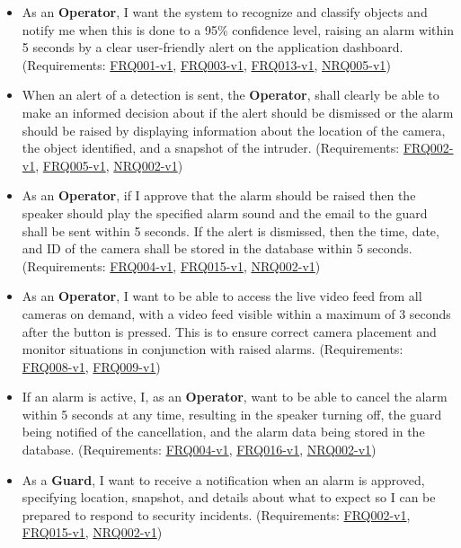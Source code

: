 \documentclass{article}
\begin{document}
 \begin{itemize}
 
    \item As an \textbf{Operator}, I want the system to recognize and classify objects and notify me when this is done to a 95\% confidence level, raising an alarm within 5 seconds by a clear user-friendly alert on the application dashboard. (Requirements: \hyperlink{FRQ001}{FRQ001-v1}, \hyperlink{FRQ003}{FRQ003-v1}, \hyperlink{FRQ013}{FRQ013-v1}, \hyperlink{NRQ005}{NRQ005-v1})
    
    \item When an alert of a detection is sent, the \textbf{Operator}, shall clearly be able to make an informed decision about if the alert should be dismissed or the alarm should be raised by displaying information about the location of the camera, the object identified, and a snapshot of the intruder. (Requirements: \hyperlink{FRQ002}{FRQ002-v1}, \hyperlink{FRQ005}{FRQ005-v1}, \hyperlink{NRQ002}{NRQ002-v1})
    
    \item As an \textbf{Operator}, if I approve that the alarm should be raised then the speaker should play the specified alarm sound and the email to the guard shall be sent within 5 seconds. If the alert is dismissed, then the time, date, and ID of the camera shall be stored in the database within 5 seconds. (Requirements: \hyperlink{FRQ004}{FRQ004-v1}, \hyperlink{FRQ015}{FRQ015-v1}, \hyperlink{NRQ002}{NRQ002-v1})
    
    \item As an \textbf{Operator}, I want to be able to access the live video feed from all cameras on demand, with a video feed visible within a maximum of 3 seconds after the button is pressed. This is to ensure correct camera placement and monitor situations in conjunction with raised alarms. (Requirements: \hyperlink{FRQ008}{FRQ008-v1}, \hyperlink{FRQ009}{FRQ009-v1})

    \item If an alarm is active, I, as an \textbf{Operator}, want to be able to cancel the alarm within 5 seconds at any time, resulting in the speaker turning off, the guard being notified of the cancellation, and the alarm data being stored in the database. (Requirements: \hyperlink{FRQ004}{FRQ004-v1}, \hyperlink{FRQ016}{FRQ016-v1}, \hyperlink{NRQ002}{NRQ002-v1})
    
    \item As a \textbf{Guard}, I want to receive a notification when an alarm is approved, specifying location, snapshot, and details about what to expect so I can be prepared to respond to security incidents. (Requirements: \hyperlink{FRQ002}{FRQ002-v1}, \hyperlink{FRQ015}{FRQ015-v1}, \hyperlink{NRQ002}{NRQ002-v1})


\end{itemize}
\end{document}

